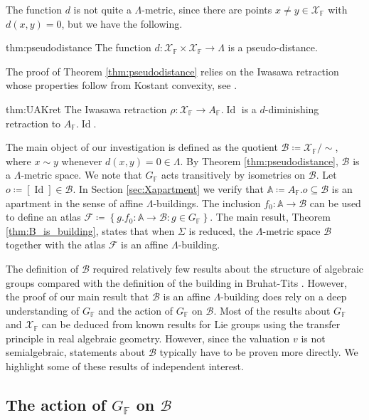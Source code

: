 \documentclass[12pt]{amsart}
\newcommand{\F}{\mathbb{F} }
\newcommand{\X}{\mathcal{X}}
\newcommand{\A}{\mathbb{A}}
\newcommand{\Fun}{\mathscr{F}} %
\newcommand{\B}{\mathcal{B}}
\numberwithin{equation}{section}
\theoremstyle{remark} %
\begin{document}
The function $d$ is not quite a $\Lambda$-metric, since there are points $x\neq y \in \X_\F$ with $d(x,y) = 0$, but we have the following.
\begin{reptheorem}{thm:pseudodistance}
	The function $d \colon \X_\F \times \X_\F \to \Lambda$ is a pseudo-distance.
\end{reptheorem}
The proof of Theorem \ref{thm:pseudodistance} relies on the Iwasawa retraction whose properties follow from Kostant convexity, see \cite[Theorems \ref{I-thm:KAU} and \ref{I-thm:kostant_F}]{AppAGRCF}.
\begin{reptheorem}{thm:UAKret}
	The Iwasawa retraction $\rho \colon \X_\F \to A_\F.\operatorname{Id}$ is a $d$-diminishing retraction to $A_\F.\operatorname{Id}$.
\end{reptheorem} 
The main object of our investigation is defined as the quotient $\B \coloneq \X_\F/\!\!\sim$, where $x \sim y$ whenever $d(x,y)=0 \in \Lambda$. By Theorem \ref{thm:pseudodistance}, $\B$ is a $\Lambda$-metric space. We note that $G_\F$ acts transitively by isometries on $\B$. Let $o \coloneq [\operatorname{Id}] \in \B$. In Section \ref{sec:Xapartment} we verify that $\A \coloneq A_\F.o  \subseteq \B$ is an apartment in the sense of affine $\Lambda$-buildings. The inclusion $f_0 \colon \A  \to \B$ can be used to define an atlas $\Fun \coloneq \left\{ g.f_0 \colon \A \to \B \colon g \in G_\F \right\}$. The main result, Theorem \ref{thm:B_is_building}, states that when $\Sigma$ is reduced, the $\Lambda$-metric space $\B$ together with the atlas $\Fun$ is an affine $\Lambda$-building.

The definition of $\B$ required relatively few results about the structure of algebraic groups compared with the definition of the building in Bruhat-Tits \cite{BrTi}. However, the proof of our main result that $\B$ is an affine $\Lambda$-building does rely on a deep understanding of $G_\F$ and the action of $G_\F$ on $\B$. Most of the results about $G_\F$ and $\X_\F$ can be deduced from known results for Lie groups using the transfer principle in real algebraic geometry. However, since the valuation $v$ is not semialgebraic, statements about $\B$ typically have to be proven more directly. We highlight some of these results of independent interest.
 
\subsection{The action of \texorpdfstring{$G_\F$}{G(F)} on \texorpdfstring{$\B$}{B}}
\end{document}
